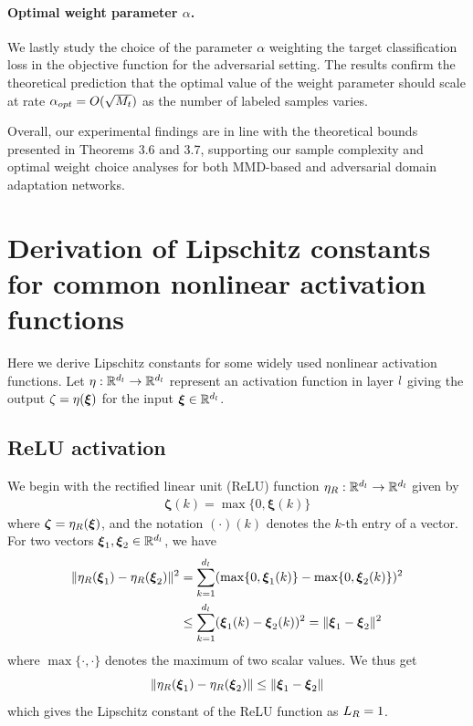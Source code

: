 \documentclass[review,supplement,onefignum,onetabnum]{siamonline250211}
\begin{document}
\paragraph{Optimal weight parameter $\alpha$.}
We lastly study the choice of the parameter $\alpha$ weighting the target classification loss in the objective function for the adversarial setting. The results confirm the theoretical prediction that the  optimal value  of the weight parameter should scale at rate $\alpha_{opt} =O( \sqrt{M_t})$ as the number of labeled samples varies.

Overall, our experimental findings are in line with the theoretical bounds presented in Theorems 3.6 and 3.7, supporting our sample complexity and optimal weight choice analyses for both MMD-based and adversarial domain adaptation networks.

\clearpage

\section{Derivation of Lipschitz constants for common nonlinear activation functions}
\label{sec_app_lip_nonlinact}

Here we derive Lipschitz constants for some widely used nonlinear activation functions. Let $\eta: \mathbb{R}^{d_l} \rightarrow \mathbb{R}^{d_l}$ represent an activation function in layer $l$ giving the output $\zeta= \eta (\boldsymbol{\xi})$ for the input $\boldsymbol{\xi} \in \mathbb{R}^{d_l}$.   

\subsection{ReLU activation}
We begin with the rectified linear unit (ReLU) function $\eta_{R}: \mathbb{R}^{d_l} \rightarrow \mathbb{R}^{d_l}$ given by
%
\begin{equation}
\begin{split}
\boldsymbol{\zeta}(k) = \max \{ 0, \boldsymbol{\xi}(k) \}
\end{split}
\end{equation}
%
where $\boldsymbol{\zeta}= \eta_R (\boldsymbol{\xi})$, and the notation $(\cdot)(k)$ denotes the $k$-th entry of a vector. For two vectors $\boldsymbol{\xi}_1, \boldsymbol{\xi}_2 \in \mathbb{R}^{d_l}$, we have
%
\begin{equation}
\begin{split}
\|  \eta_R(\boldsymbol{\xi}_1) - \eta_R(\boldsymbol{\xi}_2)  \|^2 
&=\sum_{k=1}^{{d_l}} ( \max \{ 0, \boldsymbol{\xi}_1(k) \} -    \max \{ 0, \boldsymbol{\xi}_2(k) \} )^2 \\
&\leq \sum_{k=1}^{{d_l}} ( \boldsymbol{\xi}_1(k) - \boldsymbol{\xi}_2(k))^2 
= \| \boldsymbol{\xi}_1 - \boldsymbol{\xi}_2 \|^2  \\
\end{split}
\end{equation}
%
where $\max\{\cdot, \cdot\}$ denotes the maximum of two scalar values. We thus get
%
\[
\|  \eta_R(\boldsymbol{\xi}_1) - \eta_R(\boldsymbol{\xi}_2)  \| \leq \| \boldsymbol{\xi}_1 - \boldsymbol{\xi}_2 \|
\]
%
which gives the Lipschitz constant of the ReLU function as $L_R =1$.
\end{document}

